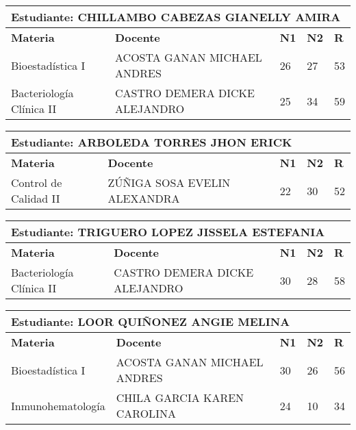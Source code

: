 \small
\begin{tabularx}{\textwidth}{|p{5cm}|p{7cm}|X|X|X|}
\hline
\multicolumn{5}{|p{\dimexpr\textwidth-2\tabcolsep-2\arrayrulewidth}|}{\textbf{Estudiante: CHILLAMBO CABEZAS GIANELLY AMIRA }}\\\hline
\textbf{Materia} & \textbf{Docente} & \textbf{N1} & \textbf{N2} & \textbf{R} \\ \hline
Bioestadística I & ACOSTA GANAN MICHAEL ANDRES  & 26 & 27& 53 \\ \hline
Bacteriología Clínica II & CASTRO DEMERA DICKE ALEJANDRO  & 25 & 34& 59 \\ \hline
\end{tabularx}\vspace{10mm}
\small
\begin{tabularx}{\textwidth}{|p{5cm}|p{7cm}|X|X|X|}
\hline
\multicolumn{5}{|p{\dimexpr\textwidth-2\tabcolsep-2\arrayrulewidth}|}{\textbf{Estudiante: ARBOLEDA TORRES JHON ERICK }}\\\hline
\textbf{Materia} & \textbf{Docente} & \textbf{N1} & \textbf{N2} & \textbf{R} \\ \hline
Control de Calidad II & ZÚÑIGA SOSA EVELIN ALEXANDRA  & 22 & 30& 52 \\ \hline
\end{tabularx}\vspace{10mm}
\small
\begin{tabularx}{\textwidth}{|p{5cm}|p{7cm}|X|X|X|}
\hline
\multicolumn{5}{|p{\dimexpr\textwidth-2\tabcolsep-2\arrayrulewidth}|}{\textbf{Estudiante: TRIGUERO LOPEZ JISSELA ESTEFANIA }}\\\hline
\textbf{Materia} & \textbf{Docente} & \textbf{N1} & \textbf{N2} & \textbf{R} \\ \hline
Bacteriología Clínica II & CASTRO DEMERA DICKE ALEJANDRO  & 30 & 28& 58 \\ \hline
\end{tabularx}\vspace{10mm}
\small
\begin{tabularx}{\textwidth}{|p{5cm}|p{7cm}|X|X|X|}
\hline
\multicolumn{5}{|p{\dimexpr\textwidth-2\tabcolsep-2\arrayrulewidth}|}{\textbf{Estudiante: LOOR QUIÑONEZ ANGIE MELINA }}\\\hline
\textbf{Materia} & \textbf{Docente} & \textbf{N1} & \textbf{N2} & \textbf{R} \\ \hline
Bioestadística I & ACOSTA GANAN MICHAEL ANDRES  & 30 & 26& 56 \\ \hline
Inmunohematología & CHILA GARCIA KAREN CAROLINA  & 24 & 10& 34 \\ \hline
\end{tabularx}\vspace{10mm}
